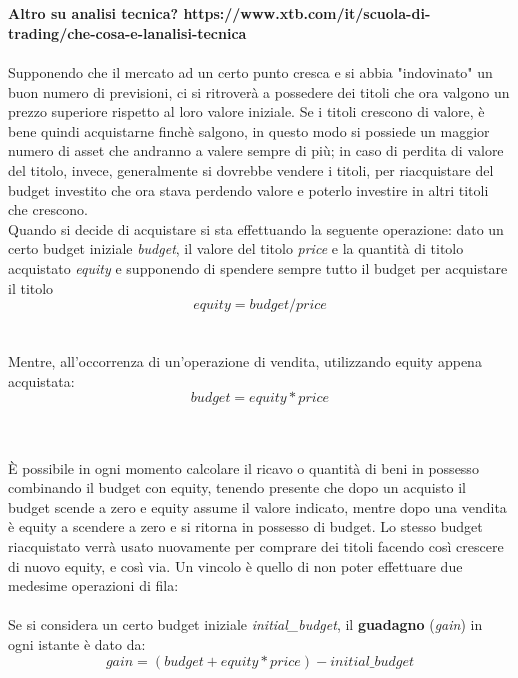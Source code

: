 \documentclass{article}
\numberwithin{equation}{section}
\begin{document}
		\\~\\
		\textbf{Altro su analisi tecnica? https://www.xtb.com/it/scuola-di-trading/che-cosa-e-lanalisi-tecnica}
		\\~\\
		Supponendo che il mercato ad un certo punto cresca e si abbia "indovinato" un buon numero di previsioni, ci si ritroverà a possedere dei titoli che ora valgono un prezzo superiore rispetto al loro valore iniziale. Se i titoli crescono di valore, è bene quindi acquistarne finchè salgono, in questo modo si possiede un maggior numero di asset che andranno a valere sempre di più; in caso di perdita di valore del titolo, invece, generalmente si dovrebbe vendere i titoli, per riacquistare del budget investito che ora stava perdendo valore e poterlo investire in altri titoli che crescono.\\
		Quando si decide di acquistare si sta effettuando la seguente operazione: dato un certo budget iniziale \textit{budget}, il valore del titolo \textit{price} e la quantità di titolo acquistato \textit{equity} e supponendo di spendere sempre tutto il budget per acquistare il titolo
		\\
		
		\begin{equation}
			equity=budget/price
		\end{equation}
		\\~\\
		Mentre, all'occorrenza di un'operazione di vendita, utilizzando equity appena acquistata:\\

		\begin{equation}
			budget=equity*price
		\end{equation}

		\\~\\
		È possibile in ogni momento calcolare il ricavo o quantità di beni in possesso combinando il budget con equity, tenendo presente che dopo un acquisto il budget scende a zero e equity assume il valore indicato, mentre dopo una vendita è equity a scendere a zero e si ritorna in possesso di budget. Lo stesso budget riacquistato verrà usato nuovamente per comprare dei titoli facendo così crescere di nuovo equity, e così via. Un vincolo è quello di non poter effettuare due medesime operazioni di fila: 
		\\~\\
		Se si considera un certo budget iniziale \textit{initial\_budget}, il \textbf{guadagno} (\textit{gain}) in ogni istante è dato da:
		\\
		\begin{equation}
			gain=(budget+equity*price)-initial\_budget
		\end{equation}
\end{document}
